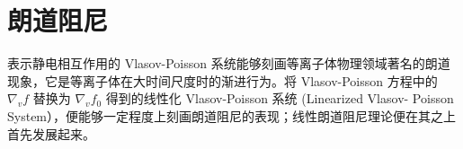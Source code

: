 






\section{朗道阻尼}
\label{sec:asymptotic}

表示静电相互作用的 Vlasov-Poisson 系统能够刻画等离子体物理领域著名的朗道现象，它是等离子体在大时间尺度时的渐进行为。将 Vlasov-Poisson 方程中的 $\nabla_{v} f$ 替换为 $\nabla_{v}f_0$ 得到的线性化 Vlasov-Poisson 系统 (Linearized Vlasov- Poisson System），便能够一定程度上刻画朗道阻尼的表现；线性朗道阻尼理论便在其之上首先发展起来。

